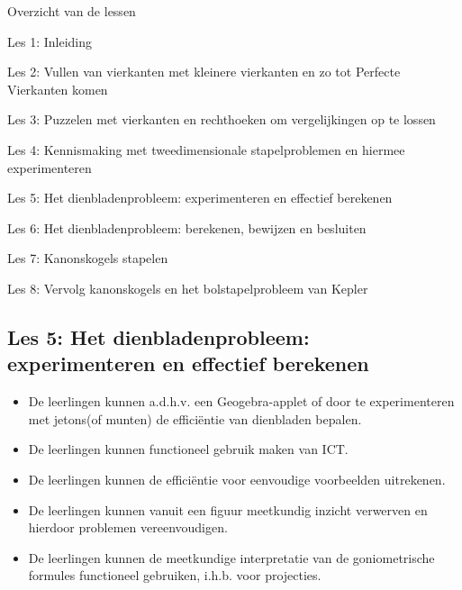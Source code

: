 \documentclass[dutch]{beamer}
\begin{document}
\begin{frame}
{Overzicht van de lessen}
\begin{list}{\quad}{}
\item Les 1: Inleiding
\item Les 2: Vullen van vierkanten met kleinere vierkanten en zo tot Perfecte Vierkanten komen
\item Les 3: Puzzelen met vierkanten en rechthoeken om vergelijkingen op te lossen
\item Les 4: Kennismaking met tweedimensionale stapelproblemen en hiermee experimenteren
\item {\color{blue}Les 5: Het dienbladenprobleem: experimenteren en effectief berekenen}
\item Les 6: Het dienbladenprobleem: berekenen, bewijzen en besluiten
\item Les 7: Kanonskogels stapelen
\item Les 8: Vervolg kanonskogels en het bolstapelprobleem van Kepler
\end{list}
\end{frame}

\subsection{Les 5: Het dienbladenprobleem: experimenteren en effectief berekenen}

\begin{frame}
\begin{itemize}
\item De leerlingen kunnen a.d.h.v. een Geogebra-applet of door te experimenteren met jetons(of munten) de effici\"{e}ntie van dienbladen bepalen.
\item De leerlingen kunnen functioneel gebruik maken van ICT.
\item De leerlingen kunnen de effici\"{e}ntie voor eenvoudige voorbeelden uitrekenen.
\item De leerlingen kunnen vanuit een figuur meetkundig inzicht verwerven en hierdoor problemen vereenvoudigen.
\item De leerlingen kunnen de meetkundige interpretatie van de goniometrische formules functioneel gebruiken, i.h.b. voor projecties.
\end{itemize}
\end{frame}
\end{document}
